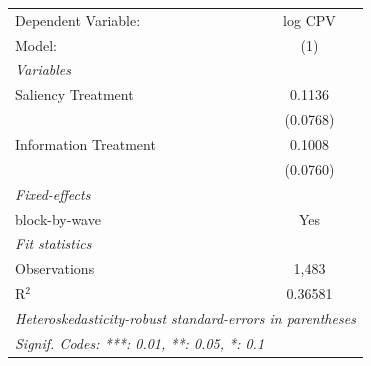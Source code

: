 \begin{tabular}{lc}
   \tabularnewline \midrule \midrule
   Dependent Variable:   & log CPV\\  
   Model:                & (1)\\  
   \midrule
   \emph{Variables}\\
   Saliency Treatment    & 0.1136\\   
                         & (0.0768)\\   
   Information Treatment & 0.1008\\   
                         & (0.0760)\\   
   \midrule
   \emph{Fixed-effects}\\
   block-by-wave         & Yes\\  
   \midrule
   \emph{Fit statistics}\\
   Observations          & 1,483\\  
   R$^2$                 & 0.36581\\  
   \midrule \midrule
   \multicolumn{2}{l}{\emph{Heteroskedasticity-robust standard-errors in parentheses}}\\
   \multicolumn{2}{l}{\emph{Signif. Codes: ***: 0.01, **: 0.05, *: 0.1}}\\
\end{tabular}
